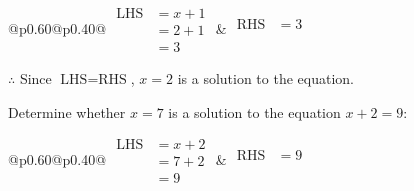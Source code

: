 \documentclass[12pt]{article}
\newcounter{minipagecount}
\begin{document}
\begin{multicols}{2}
\begin{minipage}[t]{0.40\textwidth}
    \noindent
    \renewcommand{\arraystretch}{1.3} %
    \begin{tabular}{@{}p{0.60\linewidth}@{}p{0.40\linewidth}@{}}
        \(\begin{aligned}
            \text{LHS} &= x + 1 \\
                    &= 2 + 1 \\
                    &= 3 
        \end{aligned}\) &
        \(\begin{aligned}
            \text{RHS} &= 3\\
                    & \\
                    &
        \end{aligned}\)
    \end{tabular}
    \renewcommand{\arraystretch}{1.0} %
    \vspace{2pt}  %

    \noindent \(\therefore\) Since \(\text{LHS} = \text{RHS}\), \(x = 2\) is  a solution to the equation.

\end{minipage}

 \vspace*{16pt}
\noindent{(\theminipagecount)}\hspace{0.1mm} %
\begin{minipage}[t]{0.40\textwidth} %

    \noindent Determine whether \(x = 7\) is a solution to the equation \(x + 2 = 9\):
    \vspace{4pt}  %

    \noindent
    \renewcommand{\arraystretch}{1.3} %
    \begin{tabular}{@{}p{0.60\linewidth}@{}p{0.40\linewidth}@{}}
        \(\begin{aligned}
            \text{LHS} &= x + 2 \\
                    &= 7 + 2 \\
                    &= 9 
        \end{aligned}\) &
        \(\begin{aligned}
            \text{RHS} &= 9\\
                    & \\
                    &
        \end{aligned}\)
    \end{tabular}
    \renewcommand{\arraystretch}{1.0} %
    \vspace{2pt}  %


\end{minipage}
\end{multicols}
\end{document}
